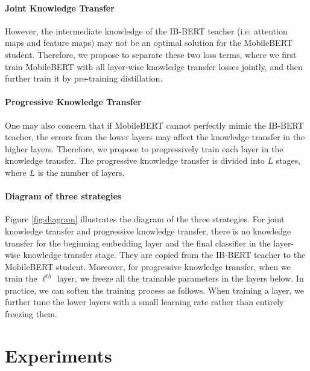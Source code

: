 \documentclass[11pt,a4paper]{article}
\begin{document}
\paragraph{Joint Knowledge Transfer}

However, the intermediate knowledge of the IB-BERT teacher (i.e. attention maps and feature maps) may not be an optimal solution for the MobileBERT student.
Therefore, we propose to separate these two loss terms, where we first train MobileBERT with all layer-wise knowledge transfer losses jointly, and then further train it by pre-training distillation.

\paragraph{Progressive Knowledge Transfer}

One may also concern that if MobileBERT cannot perfectly mimic the IB-BERT teacher, the errors from the lower layers may affect the knowledge transfer in the higher layers. Therefore, we propose to progressively train each layer in the knowledge transfer. The progressive knowledge transfer is divided into $L$ stages, where $L$ is the number of layers.


\paragraph{Diagram of three strategies}

Figure \ref{fig:diagram} illustrates the diagram of the three strategies. For joint knowledge transfer and progressive knowledge transfer, there is no knowledge transfer for the beginning embedding layer and the final classifier in the layer-wise knowledge transfer stage. They are copied from the IB-BERT teacher to the MobileBERT student. Moreover, for progressive knowledge transfer, when we train the $\ell^{th}$ layer,  we freeze all the trainable parameters in the layers below. In practice, we can soften the training process as follows. When training a layer, we further tune the lower layers with a small learning rate rather than entirely freezing them.









\section{Experiments}
 
\end{document}
